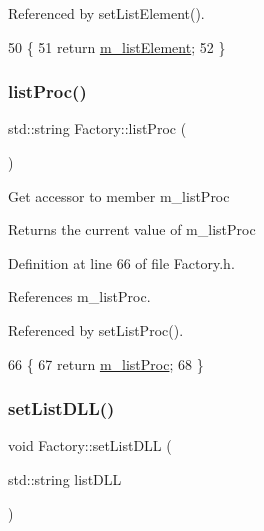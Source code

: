 Referenced by set\+List\+Element().


\begin{DoxyCode}
50                          \{
51     \textcolor{keywordflow}{return} \hyperlink{classFactory_a83a99d80105fab2371ce03230b90e8a3}{m\_listElement};
52   \}
\end{DoxyCode}
\mbox{\label{classFactory_afb222fc976d624fa6fdcb30f0aca586c}} 
\subsubsection{\texorpdfstring{list\+Proc()}{listProc()}}
{\footnotesize\ttfamily std\+::string Factory\+::list\+Proc (\begin{DoxyParamCaption}{ }\end{DoxyParamCaption})\hspace{0.3cm}{\ttfamily [inline]}}

Get accessor to member m\+\_\+list\+Proc \begin{DoxyReturn}{Returns}
the current value of m\+\_\+list\+Proc 
\end{DoxyReturn}


Definition at line 66 of file Factory.\+h.



References m\+\_\+list\+Proc.



Referenced by set\+List\+Proc().


\begin{DoxyCode}
66                         \{
67     \textcolor{keywordflow}{return} \hyperlink{classFactory_aec20c1d0a1ef175f55a82e868edabe88}{m\_listProc};
68   \}
\end{DoxyCode}
\mbox{\label{classFactory_a0f10adde2d57c8a1d07fdb4557f3ac3b}} 
\subsubsection{\texorpdfstring{set\+List\+D\+L\+L()}{setListDLL()}}
{\footnotesize\ttfamily void Factory\+::set\+List\+D\+LL (\begin{DoxyParamCaption}\item[{std\+::string}]{list\+D\+LL }\end{DoxyParamCaption})\hspace{0.3cm}{\ttfamily [inline]}}

